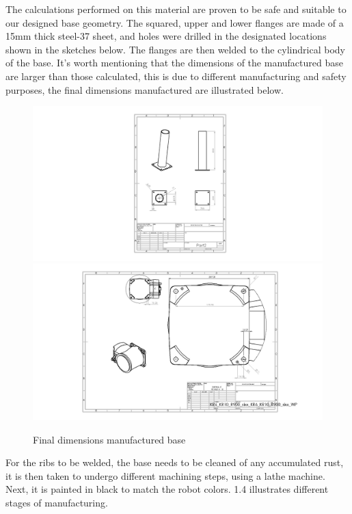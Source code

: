 The calculations performed on this material are proven to be safe and suitable to our designed base geometry. 
\vspace{0.2 cm}
\newline The squared, upper and lower flanges are made of a 15mm thick steel-37 sheet, and holes were drilled in the designated locations shown in the sketches below. The flanges are then welded to the cylindrical body of the base. It’s worth mentioning that the dimensions of the manufactured base are larger than those calculated, this is due to different manufacturing and safety purposes, the final dimensions manufactured are illustrated below.
\begin{figure}[H]
\begin{center}
	\includegraphics[scale=0.5]{BaseDim}
	\includegraphics[scale=0.5]{BaseDim2}
	\caption{Final dimensions manufactured base}
\end{center}
\end{figure}


For the ribs to be welded, the base needs to be cleaned of any accumulated rust, it is then taken to undergo different machining steps, using a lathe machine. Next, it is painted in black to match the robot colors.
\newline \figurename{1.4} illustrates different stages of manufacturing.


